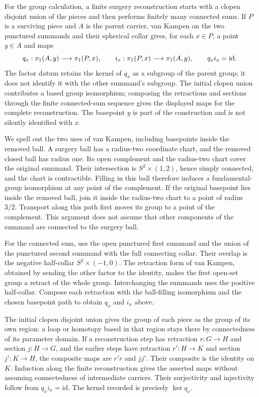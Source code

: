 For the group calculation, a finite surgery reconstruction starts with a
clopen disjoint union of the pieces and then performs finitely many connected
sums. If $P$ is a surviving piece and $A$ is the parent carrier, van Kampen on
the two punctured summands and their spherical collar gives, for each $x\in P$,
a point $y\in A$ and maps
\[
 q_x:\pi_1(A,y)\longrightarrow\pi_1(P,x),\qquad
 i_x:\pi_1(P,x)\longrightarrow\pi_1(A,y),\qquad q_x i_x={\rm id}.
\]
The factor datum retains the kernel of $q_x$ as a subgroup of the
parent group; it does not identify it with the other summand's subgroup. The
initial clopen union contributes a based group isomorphism; composing the
retractions and sections through the finite connected-sum sequence gives the
displayed maps for the complete reconstruction. The basepoint $y$ is part of
the construction and is not silently identified with $x$.

We spell out the two uses of van Kampen, including basepoints inside
the removed ball. A surgery ball has a radius-two coordinate chart,
and the removed closed ball has radius one. Its open complement and
the radius-two chart cover the original summand. Their intersection
is $S^2\times(1,2)$, hence simply connected, and the chart is
contractible. Filling in this ball therefore induces a fundamental-group
isomorphism at any point of the complement. If the original basepoint
lies inside the removed ball, join it inside the radius-two chart to
a point of radius $3/2$. Transport along this path first moves its
group to a point of the complement. This argument does not assume that
other components of the summand are connected to the surgery ball.

For the connected sum, use the open punctured first summand and the
union of the punctured second summand with the full connecting collar.
Their overlap is the negative half-collar $S^2\times(-1,0)$.
The retraction form of van Kampen, obtained by sending the other
factor to the identity, makes the first open-set group a retract of
the whole group. Interchanging the summands uses the positive
half-collar. Compose each retraction with the ball-filling isomorphism
and the chosen basepoint path to obtain $q_x$ and $i_x$ above.

The initial clopen disjoint union gives the group of each piece as
the group of its own region: a loop or homotopy based in that region
stays there by connectedness of its parameter domain. If a reconstruction
step has retraction $r:G\to H$ and section $j:H\to G$, and the
earlier steps have retraction $r':H\to K$ and section $j':K\to H$,
the composite maps are $r'r$ and $jj'$. Their composite is the identity
on $K$. Induction along the finite reconstruction gives the asserted
maps without assuming connectedness of intermediate carriers. Their
surjectivity and injectivity follow from $q_xi_x=\mathrm{id}$.
The kernel recorded is precisely $\ker q_x$.

